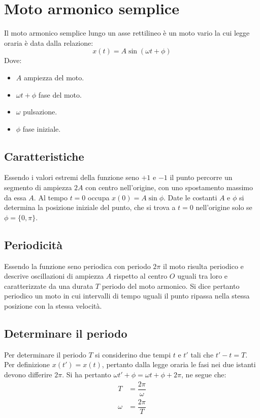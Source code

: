 \documentclass[class=book, crop=false, oneside, 12pt]{standalone}
\begin{document}
\section{Moto armonico semplice}
Il moto armonico semplice lungo un asse rettilineo \`e un moto vario la cui legge oraria \`e data dalla relazione:
$$x(t) = A \sin(\omega t + \phi)$$
Dove:
\begin{multicols}{2}
	\begin{itemize}
		\item $A$ ampiezza del moto.
		\item $\omega t + \phi$ fase del moto.
		\item $\omega$ pulsazione.
		\item $\phi$ fase iniziale.
	\end{itemize}
\end{multicols}
	\subsection{Caratteristiche}
	Essendo i valori estremi della funzione seno $+1$ e $-1$ il punto percorre un segmento di ampiezza $2A$ con centro nell'origine, con uno spostamento massimo da essa $A$.
	Al tempo $t=0$ occupa $x(0)=A\sin\phi$.
	Date le costanti $A$ e $\phi$ si determina la posizione iniziale del punto, che si trova a $t=0$ nell'origine solo se $\phi=\{0, \pi\}$.
	\subsection{Periodicit\`a}
	Essendo la funzione seno periodica con periodo $2\pi$ il moto risulta periodico e descrive oscillazioni di ampiezza $A$ rispetto al centro $O$ uguali tra loro e caratterizzate da una durata $T$ periodo del moto armonico.
	Si dice pertanto periodico un moto in cui intervalli di tempo uguali il punto ripassa nella stessa posizione con la stessa velocit\`a.
	\subsection{Determinare il periodo}
	Per determinare il periodo $T$ si considerino due tempi $t$ e $t'$ tali che $t'-t = T$.
	Per definizione $x(t')=x(t)$, pertanto dalla legge oraria le fasi nei due istanti devono differire $2\pi$.
	Si ha pertanto $\omega t' +\phi = \omega t + \phi + 2\pi$, ne segue che:
	\begin{align*}
		T &= \dfrac{2\pi}{\omega}\\
		\omega &=\dfrac{2\pi}{T}
	\end{align*}
\end{document}

